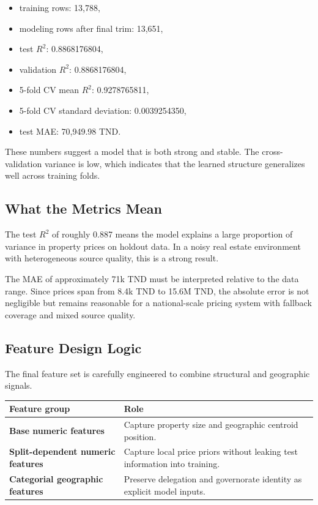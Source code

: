 \documentclass[11pt,a4paper]{article}
\begin{document}
\begin{itemize}
\item training rows: 13,788,
\item modeling rows after final trim: 13,651,
\item test $R^2$: 0.8868176804,
\item validation $R^2$: 0.8868176804,
\item 5-fold CV mean $R^2$: 0.9278765811,
\item 5-fold CV standard deviation: 0.0039254350,
\item test MAE: 70,949.98 TND.
\end{itemize}

These numbers suggest a model that is both strong and stable. The cross-validation variance is low, which indicates that the learned structure generalizes well across training folds.

\subsection{What the Metrics Mean}

The test $R^2$ of roughly 0.887 means the model explains a large proportion of variance in property prices on holdout data. In a noisy real estate environment with heterogeneous source quality, this is a strong result.

The MAE of approximately 71k TND must be interpreted relative to the data range. Since prices span from 8.4k TND to 15.6M TND, the absolute error is not negligible but remains reasonable for a national-scale pricing system with fallback coverage and mixed source quality.

\subsection{Feature Design Logic}

The final feature set is carefully engineered to combine structural and geographic signals.

\begin{center}
\begin{tabularx}{\textwidth}{>{\bfseries}p{}X}
\toprule
Feature group & Role \\
\midrule
Base numeric features & Capture property size and geographic centroid position. \\
Split-dependent numeric features & Capture local price priors without leaking test information into training. \\
Categorial geographic features & Preserve delegation and governorate identity as explicit model inputs. \\
\bottomrule
\end{tabularx}
\end{center}
\end{document}
